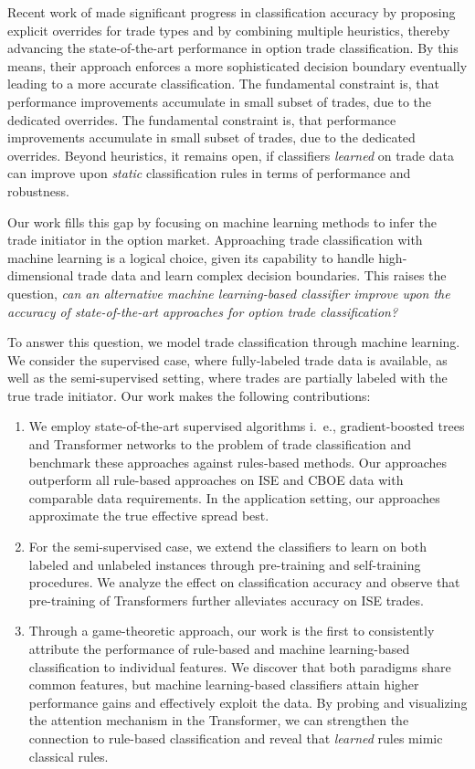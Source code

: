 Recent work of \textcite[\checkmark][13--16]{grauerOptionTradeClassification2022} made significant progress in classification accuracy by proposing explicit overrides for trade types and by combining multiple heuristics, thereby advancing the state-of-the-art performance in option trade classification. By this means, their approach enforces a more sophisticated decision boundary eventually leading to a more accurate classification. The fundamental constraint is, that performance improvements accumulate in small subset of trades, due to the dedicated overrides. The fundamental constraint is, that performance improvements accumulate in small subset of trades, due to the dedicated overrides. Beyond heuristics, it remains open, if classifiers \emph{learned} on trade data can improve upon \emph{static} classification rules in terms of performance and robustness.

Our work fills this gap by focusing on machine learning methods to infer the trade initiator in the option market. Approaching trade classification with machine learning is a logical choice, given its capability to handle high-dimensional trade data and learn complex decision boundaries. This raises the question, \emph{can an alternative machine learning-based classifier improve upon the accuracy of state-of-the-art approaches for option trade classification?}

To answer this question, we model trade classification through machine learning. We consider the supervised case, where fully-labeled trade data is available, as well as the semi-supervised setting, where trades are partially labeled with the true trade initiator. Our work makes the following contributions:
\begin{enumerate}[label=(\roman*),noitemsep]
    \item We employ state-of-the-art supervised algorithms i.~e., gradient-boosted trees and Transformer networks to the problem of trade classification and benchmark these approaches against rules-based methods. Our approaches outperform all rule-based approaches on \gls{ISE} and \gls{CBOE} data with comparable data requirements. In the application setting, our approaches approximate the true effective spread best.
    \item For the semi-supervised case, we extend the classifiers to learn on both labeled and unlabeled instances through pre-training and self-training procedures. We analyze the effect on classification accuracy and observe that pre-training of Transformers further alleviates accuracy on \gls{ISE} trades.
    \item Through a game-theoretic approach, our work is the first to consistently attribute the performance of rule-based and machine learning-based classification to individual features. We discover that both paradigms share common features, but machine learning-based classifiers attain higher performance gains and effectively exploit the data. By probing and visualizing the attention mechanism in the Transformer, we can strengthen the connection to rule-based classification and reveal that \emph{learned} rules mimic classical rules.
\end{enumerate}

